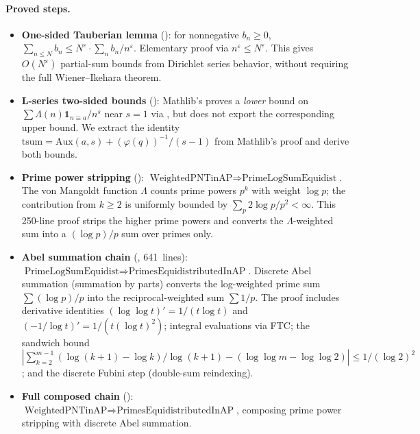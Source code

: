 \paragraph{Proved steps.}
\begin{itemize}
\item \textbf{One-sided Tauberian lemma}
():
for nonnegative $b_n \geq 0$,
$\sum_{n \leq N} b_n \leq N^\varepsilon \cdot \sum_n b_n / n^\varepsilon$.
Elementary proof via $n^\varepsilon \leq N^\varepsilon$.
This gives $O(N^\varepsilon)$ partial-sum bounds from Dirichlet series
behavior, without requiring the full Wiener--Ikehara theorem.

\item \textbf{L-series two-sided bounds}
():
Mathlib's  proves a \emph{lower} bound on
$\sum \Lambda(n)\mathbf{1}_{n \equiv a}/n^s$ near $s = 1$
via , but does not export
the corresponding upper bound.  We extract the identity
$\mathrm{tsum} = \mathrm{Aux}(a,s) + (\varphi(q))^{-1}/(s{-}1)$
from Mathlib's proof and derive both bounds.

\item \textbf{Prime power stripping}
():
$\text{WeightedPNTinAP} \Rightarrow \text{PrimeLogSumEquidist}$.
The von Mangoldt function $\Lambda$ counts prime powers
$p^k$ with weight $\log p$; the contribution from $k \geq 2$
is uniformly bounded by $\sum_p 2\log p / p^2 < \infty$.
This 250-line proof strips the higher prime powers and
converts the $\Lambda$-weighted sum into a $(\log p)/p$
sum over primes only.

\item \textbf{Abel summation chain}
(,
641~lines):
  $\text{PrimeLogSumEquidist} \Rightarrow
  \text{PrimesEquidistributedInAP}$.
  Discrete Abel summation (summation by parts) converts the
  log-weighted prime sum $\sum (\log p)/p$ into the
  reciprocal-weighted sum $\sum 1/p$.
  The proof includes derivative identities
  $(\log\log t)' = 1/(t\log t)$ and
  $(-1/\log t)' = 1/(t(\log t)^2)$; integral evaluations via FTC;
  the sandwich bound
  $|\sum_{k=2}^{m-1}(\log(k{+}1) - \log k)/\log(k{+}1)
  - (\log\log m - \log\log 2)| \leq 1/(\log 2)^2$;
  and the discrete Fubini step (double-sum reindexing).

\item \textbf{Full composed chain}
():
  $\text{WeightedPNTinAP} \Rightarrow
  \text{PrimesEquidistributedInAP}$,
  composing prime power stripping with discrete Abel summation.


\end{itemize}

